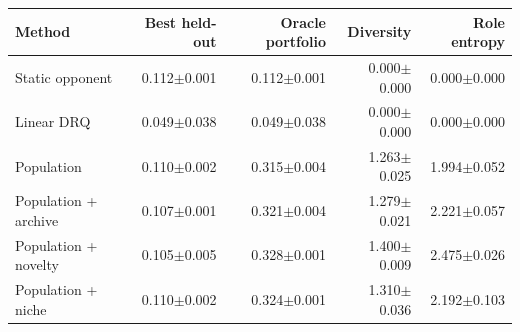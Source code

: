 \begin{tabular}{lrrrr}
\toprule
Method & Best held-out & Oracle portfolio & Diversity & Role entropy \\
\midrule
Static opponent & 0.112$\pm$0.001 & 0.112$\pm$0.001 & 0.000$\pm$0.000 & 0.000$\pm$0.000 \\
Linear DRQ & 0.049$\pm$0.038 & 0.049$\pm$0.038 & 0.000$\pm$0.000 & 0.000$\pm$0.000 \\
Population & 0.110$\pm$0.002 & 0.315$\pm$0.004 & 1.263$\pm$0.025 & 1.994$\pm$0.052 \\
Population + archive & 0.107$\pm$0.001 & 0.321$\pm$0.004 & 1.279$\pm$0.021 & 2.221$\pm$0.057 \\
Population + novelty & 0.105$\pm$0.005 & 0.328$\pm$0.001 & 1.400$\pm$0.009 & 2.475$\pm$0.026 \\
Population + niche & 0.110$\pm$0.002 & 0.324$\pm$0.001 & 1.310$\pm$0.036 & 2.192$\pm$0.103 \\
\bottomrule
\end{tabular}
